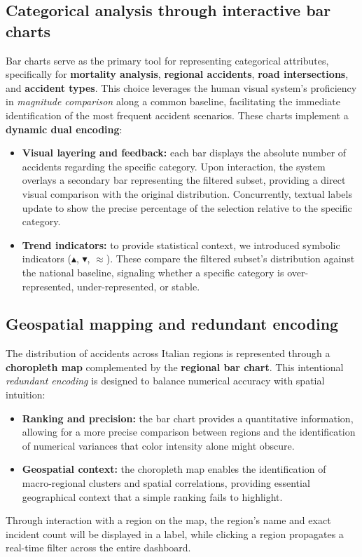 \documentclass[12pt]{article}
\begin{document}
\subsection{Categorical analysis through interactive bar charts}
Bar charts serve as the primary tool for representing categorical attributes, specifically for \textbf{mortality analysis}, \textbf{regional accidents}, \textbf{road intersections}, and \textbf{accident types}. This choice leverages the human visual system's proficiency in \textit{magnitude comparison} along a common baseline, facilitating the immediate identification of the most frequent accident scenarios.
These charts implement a \textbf{dynamic dual encoding}:
\begin{itemize}
    \item \textbf{Visual layering and feedback:} each bar displays the absolute number of accidents regarding the specific category. Upon interaction, the system overlays a secondary bar representing the filtered subset, providing a direct visual comparison with the original distribution. Concurrently, textual labels update to show the precise percentage of the selection relative to the specific category.
    \item \textbf{Trend indicators:} to provide statistical context, we introduced symbolic indicators (\textcolor{greater}{$\blacktriangle$}, \textcolor{less}{$\blacktriangledown$}, $\approx$). These compare the filtered subset's distribution against the national baseline, signaling whether a specific category is over-represented, under-represented, or stable.
\end{itemize}

\subsection{Geospatial mapping and redundant encoding}
The distribution of accidents across Italian regions is represented through a \textbf{choropleth map} complemented by the \textbf{regional bar chart}. This intentional \textit{redundant encoding} is designed to balance numerical accuracy with spatial intuition:
\begin{itemize}
    \item \textbf{Ranking and precision:} the bar chart provides a quantitative information, allowing for a more precise comparison between regions and the identification of numerical variances that color intensity alone might obscure.
    \item \textbf{Geospatial context:} the choropleth map enables the identification of macro-regional clusters and spatial correlations, providing essential geographical context that a simple ranking fails to highlight.
\end{itemize}
Through interaction with a region on the map, the region's name and exact incident count will be displayed in a label, while clicking a region propagates a real-time filter across the entire dashboard.
\end{document}
